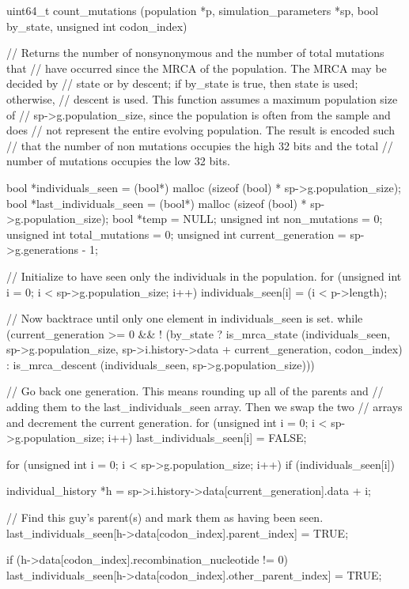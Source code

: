 \documentclass{article}
\begin{document}
\begin{ccode}
uint64_t count_mutations (population *p, simulation_parameters *sp, bool by_state,
			  unsigned int codon_index) {
  // Returns the number of nonsynonymous and the number of total mutations that
  // have occurred since the MRCA of the population. The MRCA may be decided by
  // state or by descent; if by_state is true, then state is used; otherwise,
  // descent is used. This function assumes a maximum population size of
  // sp->g.population_size, since the population is often from the sample and does
  // not represent the entire evolving population. The result is encoded such
  // that the number of non mutations occupies the high 32 bits and the total
  // number of mutations occupies the low 32 bits.

  bool        *individuals_seen 	= (bool*) malloc (sizeof (bool) * sp->g.population_size);
  bool        *last_individuals_seen	= (bool*) malloc (sizeof (bool) * sp->g.population_size);
  bool        *temp			= NULL;
  unsigned int non_mutations		= 0;
  unsigned int total_mutations		= 0;
  unsigned int current_generation	= sp->g.generations - 1;

  // Initialize to have seen only the individuals in the population.
  for (unsigned int i = 0; i < sp->g.population_size; i++)
    individuals_seen[i] = (i < p->length);

  // Now backtrace until only one element in individuals_seen is set.
  while (current_generation >= 0 &&
        ! (by_state ?
            is_mrca_state (individuals_seen, sp->g.population_size,
			   sp->i.history->data + current_generation, codon_index) :
            is_mrca_descent (individuals_seen, sp->g.population_size))) {

    // Go back one generation. This means rounding up all of the parents and
    // adding them to the last_individuals_seen array. Then we swap the two
    // arrays and decrement the current generation.
    for (unsigned int i = 0; i < sp->g.population_size; i++)
      last_individuals_seen[i] = FALSE;

    for (unsigned int i = 0; i < sp->g.population_size; i++)
      if (individuals_seen[i]) {
        individual_history *h = sp->i.history->data[current_generation].data + i;

        // Find this guy's parent(s) and mark them as having been seen.
        last_individuals_seen[h->data[codon_index].parent_index] = TRUE;

        if (h->data[codon_index].recombination_nucleotide != 0)
          last_individuals_seen[h->data[codon_index].other_parent_index] = TRUE;

}}}
\end{ccode}
\end{document}
